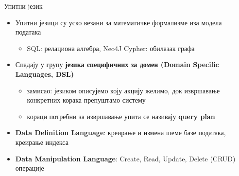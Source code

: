\documentclass[aspectratio=169]{beamer}
\begin{document}
    \begin{frame}{Упитни језик}
        \begin{itemize}
            \item Упитни језици су уско везани за математичке формализме иза модела података
            \begin{itemize}
                \item SQL: релациона алгебра, Neo4J Cypher: обилазак графа
            \end{itemize}
            \item Спадају у групу \textbf{језика специфичних за домен (Domain Specific Languages, DSL)}
            \begin{itemize}
                \item замисао: језиком описујемо коју акцију желимо, док извршавање конкретних корака препуштамо систему
                \item кораци потребни за извршавање упита се називају \textbf{query plan}
            \end{itemize}
            \item \textbf{Data Definition Language}: креирање и измена шеме базе података, креирање индекса
            \item \textbf{Data Manipulation Language}: Create, Read, Update, Delete (CRUD) операције
        \end{itemize}
    \end{frame}
    
\end{document}
